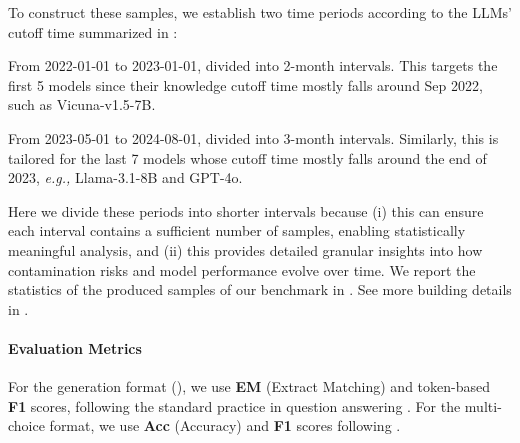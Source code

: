\documentclass[11pt]{article}
\newcommand{\eg}{\emph{e.g.,}\xspace}
\begin{document}
            To construct these samples, we establish two time periods according to the LLMs' cutoff time summarized in :
            \begin{inparaenum}
                \item
                    From 2022-01-01 to 2023-01-01, divided into 2-month intervals.
                    This targets the first 5 models since their knowledge cutoff time mostly falls around Sep 2022,
                    such as Vicuna-v1.5-7B.
                \item
                    From 2023-05-01 to 2024-08-01, divided into 3-month intervals.
                    Similarly, this is tailored for the last 7 models
                    whose cutoff time mostly falls around the end of 2023,
                    \eg Llama-3.1-8B and GPT-4o.
            \end{inparaenum}
            Here we divide these periods into shorter intervals
            because (i) this can ensure each interval contains a sufficient number of samples, enabling statistically meaningful analysis,
            and (ii) this provides detailed granular insights into how contamination risks and model performance evolve over time.            
            We report the statistics of the produced samples of our benchmark in .
            See more building details in .

        \paragraph{Evaluation Metrics}
            For the generation format (), we use \textbf{EM} (Extract Matching) and token-based \textbf{F1} scores, following the standard practice in question answering \cite{rajpurkar2016squad}.
            For the multi-choice format, we use \textbf{Acc} (Accuracy) and \textbf{F1} scores following \citet{kasai2023realtime}.


\end{document}
